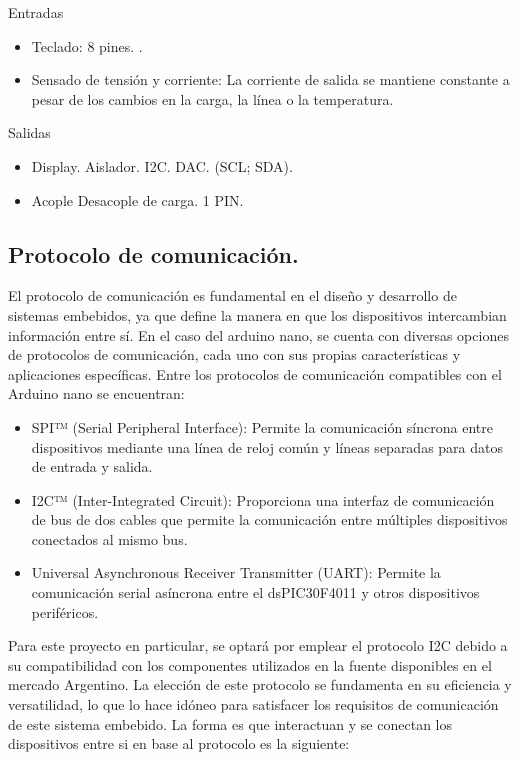 Entradas
\begin{itemize}
    \item Teclado: 8 pines. .
    \item Sensado de tensión y corriente: La corriente de salida se mantiene constante a pesar de los cambios en la carga, la línea o la temperatura.
\end{itemize}

Salidas
\begin{itemize}
    \item Display. Aislador. I2C. DAC.  (SCL; SDA).
    \item Acople Desacople de carga. 1 PIN.
\end{itemize}

\subsection{Protocolo de comunicación.}
El protocolo de comunicación es fundamental en el diseño y desarrollo de sistemas embebidos, ya que define la manera en que los dispositivos intercambian información entre sí. En el caso del arduino nano, se cuenta con diversas opciones de protocolos de comunicación, cada uno con sus propias características y aplicaciones específicas.
Entre los protocolos de comunicación compatibles con el Arduino nano se encuentran:
\begin{itemize}
    \item SPI™ (Serial Peripheral Interface): Permite la comunicación síncrona entre dispositivos mediante una línea de reloj común y líneas separadas para datos de entrada y salida.
    \item I2C™ (Inter-Integrated Circuit): Proporciona una interfaz de comunicación de bus de dos cables que permite la comunicación entre múltiples dispositivos conectados al mismo bus.
    \item Universal Asynchronous Receiver Transmitter (UART): Permite la comunicación serial asíncrona entre el dsPIC30F4011 y otros dispositivos periféricos.
\end{itemize}
Para este proyecto en particular, se optará por emplear el protocolo I2C debido a su compatibilidad con los componentes utilizados en la fuente disponibles en el mercado Argentino. La elección de este protocolo se fundamenta en su eficiencia y versatilidad, lo que lo hace idóneo para satisfacer los requisitos de comunicación de este sistema embebido.
La forma es que interactuan y se conectan los dispositivos entre si en base al protocolo es la siguiente:

